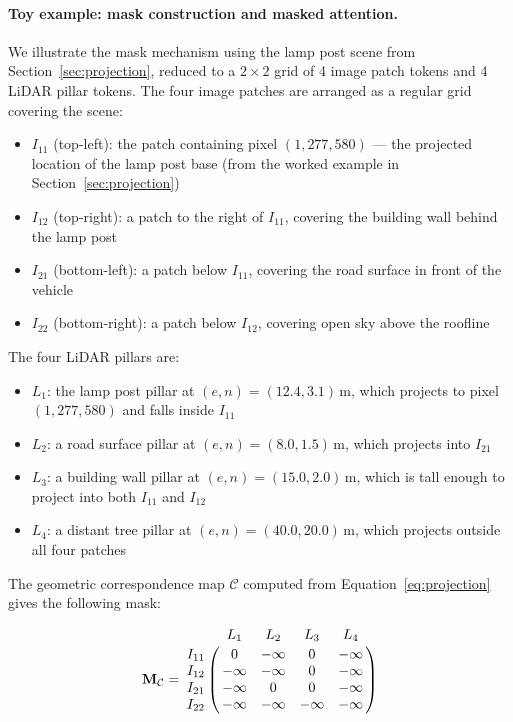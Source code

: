 \documentclass{book}
\begin{document}
\paragraph{Toy example: mask construction and masked attention.}

We illustrate the mask mechanism using the lamp post scene from
Section~\ref{sec:projection}, reduced to a $2 \times 2$ grid of
4 image patch tokens and 4 LiDAR pillar tokens.  The four image
patches are arranged as a regular grid covering the scene:
\begin{itemize}
  \item $I_{11}$ (top-left): the patch containing pixel
    $(1{,}277, 580)$ --- the projected location of the lamp post
    base (from the worked example in Section~\ref{sec:projection})
  \item $I_{12}$ (top-right): a patch to the right of $I_{11}$,
    covering the building wall behind the lamp post
  \item $I_{21}$ (bottom-left): a patch below $I_{11}$, covering
    the road surface in front of the vehicle
  \item $I_{22}$ (bottom-right): a patch below $I_{12}$, covering
    open sky above the roofline
\end{itemize}
The four LiDAR pillars are:
\begin{itemize}
  \item $L_1$: the lamp post pillar at $(e,n) = (12.4, 3.1)$\,m,
    which projects to pixel $(1{,}277, 580)$ and falls inside $I_{11}$
  \item $L_2$: a road surface pillar at $(e,n) = (8.0, 1.5)$\,m,
    which projects into $I_{21}$
  \item $L_3$: a building wall pillar at $(e,n) = (15.0, 2.0)$\,m,
    which is tall enough to project into both $I_{11}$ and $I_{12}$
  \item $L_4$: a distant tree pillar at $(e,n) = (40.0, 20.0)$\,m,
    which projects outside all four patches
\end{itemize}

\noindent The geometric correspondence map $\mathcal{C}$ computed
from Equation~\eqref{eq:projection} gives the following mask:

\begin{equation}
  \mathbf{M}_{\mathcal{C}} =
  \bordermatrix{
        & L_1      & L_2      & L_3      & L_4      \cr
    I_{11} & 0        & -\infty  & 0        & -\infty  \cr
    I_{12} & -\infty  & -\infty  & 0        & -\infty  \cr
    I_{21} & -\infty  & 0        & 0        & -\infty  \cr
    I_{22} & -\infty  & -\infty  & -\infty  & -\infty
  }
  \label{eq:mask_example}
\end{equation}
\end{document}
